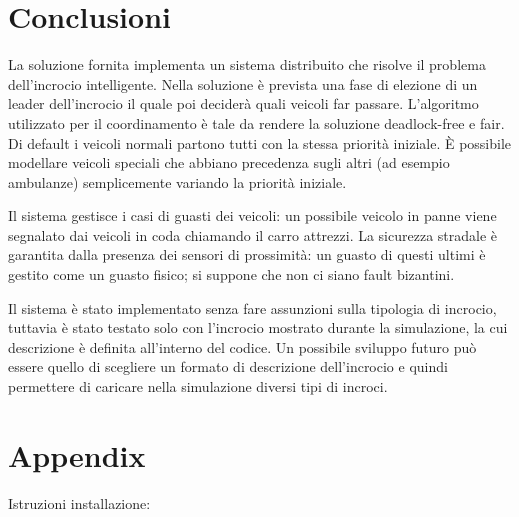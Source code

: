 \documentclass{memoir}
\begin{document}


\chapter{Conclusioni}
La soluzione fornita implementa un sistema distribuito che risolve il problema dell'incrocio intelligente.
Nella soluzione è prevista una fase di elezione di un leader dell'incrocio il quale poi deciderà quali veicoli far passare. L'algoritmo utilizzato per il coordinamento è tale da rendere la soluzione deadlock-free e fair. Di default i veicoli normali partono tutti con la stessa priorità iniziale. È possibile modellare veicoli speciali che abbiano precedenza sugli altri (ad esempio ambulanze) semplicemente variando la priorità iniziale.

Il sistema gestisce i casi di guasti dei veicoli: un possibile veicolo in panne viene segnalato dai veicoli in coda chiamando il carro attrezzi.
La sicurezza stradale è garantita dalla presenza dei sensori di prossimità: un guasto di questi ultimi è gestito come un guasto fisico; si suppone che non ci siano fault bizantini.

Il sistema è stato implementato senza fare assunzioni sulla tipologia di incrocio, tuttavia è stato testato solo con l'incrocio mostrato durante la simulazione, la cui descrizione è definita all'interno del codice.
Un possibile sviluppo futuro può essere quello di scegliere un formato di descrizione dell'incrocio e quindi permettere di caricare nella simulazione diversi tipi di incroci.


\appendix

\chapter{Appendix}

Istruzioni installazione:

\end{document}
